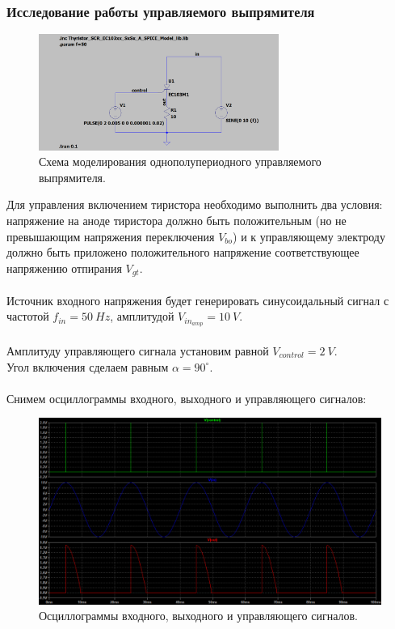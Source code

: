 \documentclass[12pt]{article}
\begin{document}
\subsubsection*{Исследование работы управляемого выпрямителя}

\begin{figure}[H]
    \centering
    \includegraphics[width=0.7\textwidth]{1_scheme.png}
    \caption{Схема моделирования однополупериодного управляемого выпрямителя.}
    \label{fig:1_scheme}
\end{figure}

Для управления включением тиристора необходимо выполнить два условия: напряжение на аноде тиристора должно быть положительным (но не превышающим напряжения переключения $V_{bo}$) и к управляющему электроду должно быть приложено положительного напряжение соответствующее напряжению отпирания $V_{gt}$. \\
\ \\
Источник входного напряжения будет генерировать синусоидальный сигнал с частотой $f_{in} = 50 \ Hz$, амплитудой $V_{{in}_{amp}} = 10 \ V$. \\
\ \\
Амплитуду управляющего сигнала установим равной $V_{control} = 2 \ V$. \\
Угол включения сделаем равным $\alpha = 90^\circ$. \\
\ \\
Снимем осциллограммы входного, выходного и управляющего сигналов:
\begin{figure}[H]
    \centering
    \includegraphics[width=\textwidth]{1_out_in_conrtrol_v.png}
    \caption{Осциллограммы входного, выходного и управляющего сигналов.}
    \label{fig:1_out_in_control_v}
\end{figure}
\end{document}
